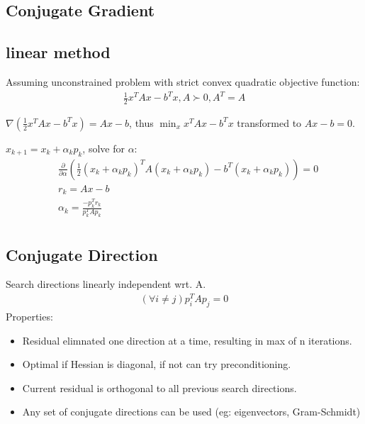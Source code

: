 \documentclass[8pt,letter]{article}
\begin{document}
\begin{multicols*}{2}
  
  \vfill\null
  \pagebreak
  
  \section{Conjugate Gradient}

  \subsection{linear method}
  Assuming unconstrained problem with strict convex quadratic objective function:
  \begin{align*}
    \frac{1}{2} x^TAx-b^Tx, A \succ 0, A^T=A
  \end{align*}
  
  $\nabla(\frac{1}{2} x^TAx-b^Tx) = Ax-b$, thus $\min_x x^TAx - b^Tx$ transformed to $Ax-b=0$.

  $x_{k+1} = x_k + \alpha_k p_k$, solve for $\alpha$:
  \begin{align*}
    &\frac{\partial}{\partial \alpha} (\frac{1}{2}(x_k + \alpha_k p_k)^T A (x_k + \alpha_k p_k) - b^T(x_k + \alpha_k p_k)) = 0\\
    &r_k = Ax-b\\
    &\alpha_k = \frac{ -p_k^T r_k}{p_k^T A p_k}\\
  \end{align*}
  \subsection{Conjugate Direction}
  Search directions linearly independent wrt. A.
  \begin{align*}
    (\forall i\not=j) p_i^T A p_j = 0
  \end{align*}
  Properties:
  \begin{itemize}
  \item Residual elimnated one direction at a time, resulting in max of n iterations.
  \item Optimal if Hessian is diagonal, if not can try preconditioning.
  \item Current residual is orthogonal to all previous search directions.
  \item Any set of conjugate directions can be used (eg: eigenvectors, Gram-Schmidt)
  \end{itemize}

  \vfill\null
  \columnbreak


\end{multicols*}
\end{document}

